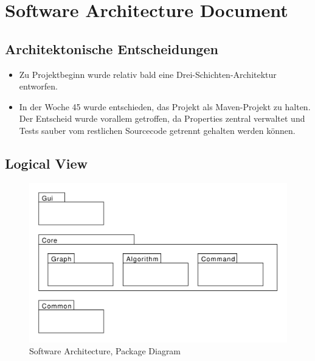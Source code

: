 \section{Software Architecture Document}
\label{sec:Software Architecture Document}
% 
% 
% 
% 
% 
\subsection{Architektonische Entscheidungen}
\begin{itemize}
  \item Zu Projektbeginn wurde relativ bald eine Drei-Schichten-Architektur entworfen.
  \item In der Woche 45 wurde entschieden, das Projekt als Maven-Projekt zu halten. Der Entscheid wurde vorallem getroffen, da Properties zentral verwaltet und Tests sauber vom restlichen Sourcecode getrennt gehalten werden k\"onnen.
\end{itemize}
% 
\subsection{Logical View}
\begin{figure}[H]
    \centering
    \includegraphics[scale=0.5]{diagrams/package-diagram.pdf}
    \caption{Software Architecture, Package Diagram}
    \label{fig:package-diagram}
\end{figure}
